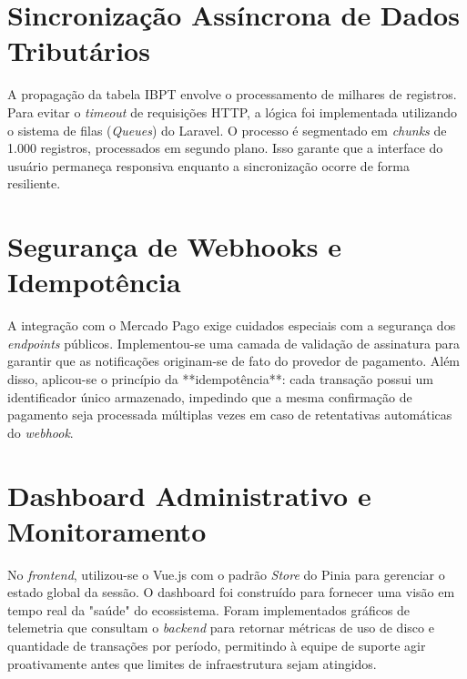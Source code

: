 \section{Sincronização Assíncrona de Dados Tributários}

A propagação da tabela IBPT envolve o processamento de milhares de registros. Para evitar o \textit{timeout} de requisições HTTP, a lógica foi implementada utilizando o sistema de filas (\textit{Queues}) do Laravel. O processo é segmentado em \textit{chunks} de 1.000 registros, processados em segundo plano. Isso garante que a interface do usuário permaneça responsiva enquanto a sincronização ocorre de forma resiliente.

\section{Segurança de Webhooks e Idempotência}

A integração com o Mercado Pago exige cuidados especiais com a segurança dos \textit{endpoints} públicos. Implementou-se uma camada de validação de assinatura para garantir que as notificações originam-se de fato do provedor de pagamento. Além disso, aplicou-se o princípio da **idempotência**: cada transação possui um identificador único armazenado, impedindo que a mesma confirmação de pagamento seja processada múltiplas vezes em caso de retentativas automáticas do \textit{webhook}.

\section{Dashboard Administrativo e Monitoramento}

No \textit{frontend}, utilizou-se o Vue.js com o padrão \textit{Store} do Pinia para gerenciar o estado global da sessão. O dashboard foi construído para fornecer uma visão em tempo real da "saúde" do ecossistema. Foram implementados gráficos de telemetria que consultam o \textit{backend} para retornar métricas de uso de disco e quantidade de transações por período, permitindo à equipe de suporte agir proativamente antes que limites de infraestrutura sejam atingidos.
